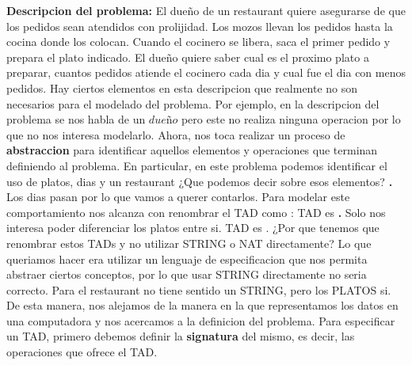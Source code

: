 \documentclass[10pt,a4paper]{article}
\begin{document}
\newline
\newline
\textbf{Descripcion del problema:} El dueño de un restaurant quiere asegurarse de que los pedidos sean atendidos con prolijidad. Los mozos llevan los pedidos hasta la cocina donde los colocan. Cuando el cocinero se libera, saca el primer pedido y prepara el plato indicado. El dueño quiere saber cual es el proximo plato a preparar, cuantos pedidos atiende el cocinero cada dia y cual fue el dia con menos pedidos.
\newline
\newline
Hay ciertos elementos en esta descripcion que realmente no son necesarios para el modelado del problema. Por ejemplo, en la descripcion del problema se nos habla de un $due$ñ$o$ pero este no realiza ninguna operacion por lo que no nos interesa modelarlo. Ahora, nos toca realizar un proceso de \textbf{abstraccion} para identificar aquellos elementos y operaciones que terminan definiendo al problema. En particular, en este problema podemos identificar el uso de platos, dias y un restaurant ¿Que podemos decir sobre esos elementos?
\newline
\newline
\newline
\newline
\textbf{.} Los dias pasan por lo que vamos a querer contarlos. Para modelar este comportamiento nos alcanza con renombrar el TAD  como : TAD  es   
\newline
\newline
\textbf{.} Solo nos interesa poder diferenciar los platos entre si. TAD  es .
\newline
\newline
¿Por que tenemos que renombrar estos TADs y no utilizar STRING o NAT directamente? Lo que queriamos hacer era utilizar un lenguaje de especificacion que nos permita abstraer ciertos conceptos, por lo que usar STRING directamente no seria correcto. Para el restaurant no tiene sentido un STRING, pero los PLATOS si. De esta manera, nos alejamos de la manera en la que representamos los datos en una computadora y nos acercamos a la definicion del problema.
\newline
\newline
Para especificar un TAD, primero debemos definir la \textbf{signatura} del mismo, es decir, las operaciones que ofrece el TAD.
\newline
\newline
\end{document}
